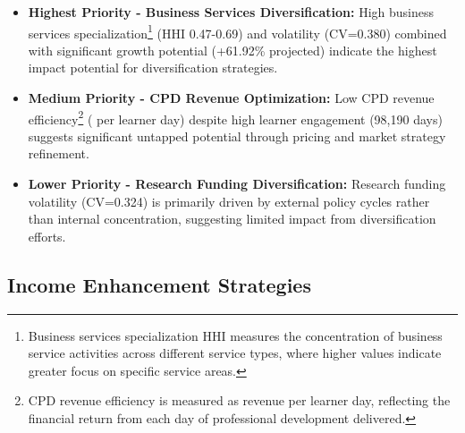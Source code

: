 \documentclass[journal,onecolumn, 10pt,draftclsnofoot]{IEEEtran}
\begin{document}
\begin{itemize}
    \item \textbf{Highest Priority - Business Services Diversification:} High business services specialization\footnote{Business services specialization HHI measures the concentration of business service activities across different service types, where higher values indicate greater focus on specific service areas.} (HHI 0.47-0.69) and volatility (CV=0.380) combined with significant growth potential (+61.92\% projected) indicate the highest impact potential for diversification strategies.
    
    \item \textbf{Medium Priority - CPD Revenue Optimization:} Low CPD revenue efficiency\footnote{CPD revenue efficiency is measured as revenue per learner day, reflecting the financial return from each day of professional development delivered.} ( per learner day) despite high learner engagement (98,190 days) suggests significant untapped potential through pricing and market strategy refinement.
    
    \item \textbf{Lower Priority - Research Funding Diversification:} Research funding volatility (CV=0.324) is primarily driven by external policy cycles rather than internal concentration, suggesting limited impact from diversification efforts.
\end{itemize}

\subsection{Income Enhancement Strategies}
\end{document}
